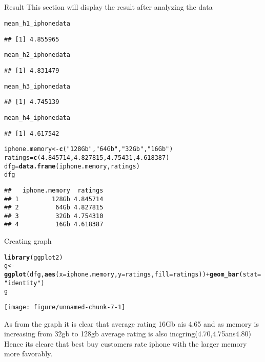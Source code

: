 \documentclass{article}\usepackage[]{graphicx}\usepackage[]{color}
\makeatletter
\def\maxwidth{ %
  \ifdim\Gin@nat@width>\linewidth
    \linewidth
  \else
    \Gin@nat@width
  \fi
}
\newcommand{\hlnum}[1]{\textcolor[rgb]{0.686,0.059,0.569}{#1}}%
\newcommand{\hlstr}[1]{\textcolor[rgb]{0.192,0.494,0.8}{#1}}%
\newcommand{\hlopt}[1]{\textcolor[rgb]{0,0,0}{#1}}%
\newcommand{\hlstd}[1]{\textcolor[rgb]{0.345,0.345,0.345}{#1}}%
\newcommand{\hlkwb}[1]{\textcolor[rgb]{0.69,0.353,0.396}{#1}}%
\newcommand{\hlkwc}[1]{\textcolor[rgb]{0.333,0.667,0.333}{#1}}%
\newcommand{\hlkwd}[1]{\textcolor[rgb]{0.737,0.353,0.396}{\textbf{#1}}}%
\newenvironment{kframe}{%
 \def\at@end@of@kframe{}%
 \ifinner\ifhmode%
  \def\at@end@of@kframe{\end{minipage}}%
  \begin{minipage}{\columnwidth}%
 \fi\fi%
 \def\FrameCommand##1{\hskip\@totalleftmargin \hskip-\fboxsep
 \colorbox{shadecolor}{##1}\hskip-\fboxsep
     \hskip-\linewidth \hskip-\@totalleftmargin \hskip\columnwidth}%
 \MakeFramed {\advance\hsize-\width
   \@totalleftmargin\z@ \linewidth\hsize
   \@setminipage}}%
 {\par\unskip\endMakeFramed%
 \at@end@of@kframe}
\newenvironment{knitrout}{}{} %
\makeatother
\begin{document}
\subsection*{}Result
This section will display the result after analyzing the data
\begin{knitrout}
\color{fgcolor}\begin{kframe}
\begin{alltt}
\hlstd{mean_h1_iphonedata}
\end{alltt}
\begin{verbatim}
## [1] 4.855965
\end{verbatim}
\begin{alltt}
\hlstd{mean_h2_iphonedata}
\end{alltt}
\begin{verbatim}
## [1] 4.831479
\end{verbatim}
\begin{alltt}
\hlstd{mean_h3_iphonedata}
\end{alltt}
\begin{verbatim}
## [1] 4.745139
\end{verbatim}
\begin{alltt}
\hlstd{mean_h4_iphonedata}
\end{alltt}
\begin{verbatim}
## [1] 4.617542
\end{verbatim}
\begin{alltt}
\hlstd{iphone.memory}\hlkwb{<-}\hlkwd{c}\hlstd{(}\hlstr{"128Gb"}\hlstd{,}\hlstr{"64Gb"}\hlstd{,}\hlstr{"32Gb"}\hlstd{,}\hlstr{"16Gb"}\hlstd{)}
\hlstd{ratings}\hlkwb{=}\hlkwd{c}\hlstd{(}\hlnum{4.845714}\hlstd{,}\hlnum{4.827815}\hlstd{,}\hlnum{4.75431}\hlstd{,}\hlnum{4.618387}\hlstd{)}
\hlstd{dfg}\hlkwb{=}\hlkwd{data.frame}\hlstd{(iphone.memory,ratings)}
\hlstd{dfg}
\end{alltt}
\begin{verbatim}
##   iphone.memory  ratings
## 1         128Gb 4.845714
## 2          64Gb 4.827815
## 3          32Gb 4.754310
## 4          16Gb 4.618387
\end{verbatim}
\end{kframe}
\end{knitrout}
Creating graph 

\begin{knitrout}
\color{fgcolor}\begin{kframe}
\begin{alltt}
\hlkwd{library}\hlstd{(ggplot2)}
\hlstd{g}\hlkwb{<-}\hlkwd{ggplot}\hlstd{(dfg,}\hlkwd{aes}\hlstd{(}\hlkwc{x}\hlstd{=iphone.memory,}\hlkwc{y}\hlstd{=ratings,}\hlkwc{fill}\hlstd{=ratings))}\hlopt{+}\hlkwd{geom_bar}\hlstd{(}\hlkwc{stat}\hlstd{=}\hlstr{"identity"}\hlstd{)}
\hlstd{g}
\end{alltt}
\end{kframe}
\texttt{[image: figure/unnamed-chunk-7-1]} 

\end{knitrout}
As from the graph it is clear that average rating 16Gb ais 4.65 and 
as memory is increasing from 32gb to 128gb average rating is also incgring(4.70,4.75ans4.80)
Hence its cleare that best buy customers rate iphone with the larger memory more favorably.
\end{document}
